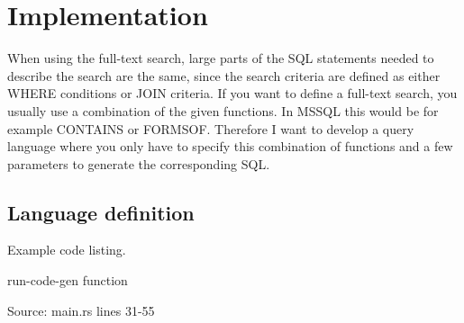 \newpage
\section{Implementation}
When using the full-text search, large parts of the SQL statements needed to describe the search are the same, since the search criteria are defined as either WHERE conditions or JOIN criteria. If you want to define a full-text search, you usually use a combination of the given functions. In MSSQL this would be for example CONTAINS or FORMSOF. Therefore I want to develop a query language where you only have to specify this combination of functions and a few parameters to generate the corresponding SQL.
\subsection{Language definition}
Example code listing.
\begin{mycapcode}[H]
    \caption{run-code-gen function}
    
    \centerline{Source: main.rs lines 31-55}
\end{mycapcode}
